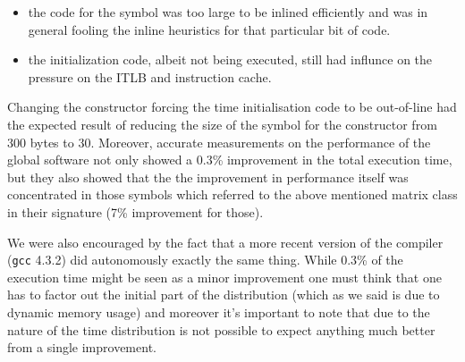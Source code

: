 \documentclass[a4paper]{jpconf}
\begin{document}
\begin{itemize}


\item the code for the symbol was too large to be inlined efficiently and was in general fooling the inline heuristics for that particular bit of code.

\item the initialization code, albeit not being executed, still had influnce on the pressure on the ITLB and instruction cache.
\end{itemize}

Changing the constructor forcing the time initialisation code to be out-of-line had the expected result of reducing the size of the symbol for the constructor from 300 bytes to 30. Moreover, accurate measurements on the performance of the global software not only showed a 0.3\% improvement in the total execution time, but they also showed that the the improvement in performance itself was concentrated in those symbols which referred to the above mentioned matrix class in their signature (7\% improvement for those).


\begin{figure}
\caption{}
\label{}
\begin{center}
\end{center}
\end{figure}



We were also encouraged by the fact that a more recent version of the compiler (\texttt{gcc} 4.3.2) did autonomously exactly the same thing. While 0.3\% of the execution time might be seen as a minor improvement one must think that one has to factor out the initial part of the distribution (which as we said is due to dynamic memory usage) and moreover it's important to note that due to the nature of the time distribution is not possible to expect anything much better from a single improvement.
\end{document}
